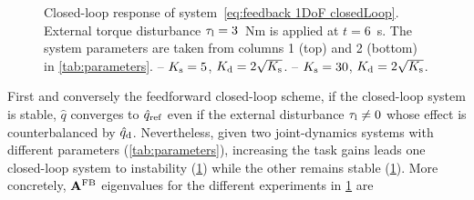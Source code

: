 \begin{figure}[htp!]
	\centering
	\hfil
	\hfil
	\hfil
	\caption{Closed-loop response of system~\eqref{eq:feedback 1DoF closedLoop}. External torque disturbance $\tau_{\rm l} = 3$~Nm is applied at $t=6$~s. The system parameters are taken from columns 1 (top) and 2 (bottom) in  \cref{tab:parameters}. -- $K_{\rm s} = 5$, $K_{\rm d} = 2\sqrt{K_{\rm s}}$. -- $K_{\rm s} = 30$, $K_{\rm d} = 2\sqrt{K_{\rm s}}$.}
	\label{fig:closedloop 1dof simulation}
\end{figure}
First and conversely the feedforward closed-loop scheme, if the closed-loop system is stable, $\hat{q}$ converges to $\hat{q}_{\rm ref}$ even if the external disturbance $\tau_{\rm l}\neq0$ whose effect  is counterbalanced by $\hat{q}_{\rm d}$.
Nevertheless, given two joint-dynamics systems with different parameters (\cref{tab:parameters}), increasing the task gains leads one closed-loop system to instability (\cref{fig:closedloop 1dof simulation}) while the other remains stable  (\cref{fig:closedloop 1dof simulation}). 
More concretely, $\mathbf{A}^{\rm FB}$ eigenvalues for the different experiments in \cref{fig:closedloop 1dof simulation} are 
